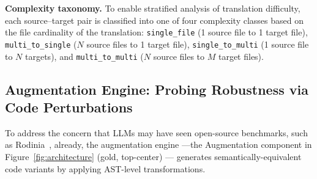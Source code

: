 \documentclass{article}
\begin{document}
\textbf{Complexity taxonomy.} To enable stratified analysis of translation difficulty, each source--target pair is classified into one of four complexity classes based on the file cardinality of the translation: \texttt{single\_file} (1 source file to 1 target file), \texttt{multi\_to\_single} ($N$ source files to 1 target file), \texttt{single\_to\_multi} (1 source file to $N$ targets), and \texttt{multi\_to\_multi} ($N$ source files to $M$ target files).



\subsection{Augmentation Engine: Probing Robustness via Code Perturbations}
\label{sec:augmentation-engine}

To address the concern that LLMs may have seen open-source benchmarks, such as Rodinia~\cite{Rodinia2009}, already, the augmentation engine ---the Augmentation component in Figure~\ref{fig:architecture} (gold, top-center) --- generates semantically-equivalent code variants by applying AST-level transformations.
\end{document}
